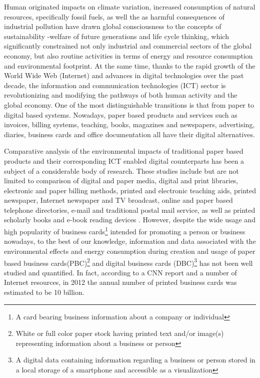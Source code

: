 \documentclass[conference]{IEEEtran}
\begin{document}
Human originated impacts on climate variation, increased consumption of natural resources, specifically fossil fuels, as well the as harmful consequences of industrial pollution have drawn global consciousness to the concepts of sustainability -welfare of future generations and life cycle thinking, which significantly constrained not only industrial and commercial sectors of the global economy, but also routine activities in terms of energy and resource consumption and environmental footprint. At the same time, thanks to the rapid growth of the World Wide Web (Internet) and advances in digital technologies over the past decade, the information and communication technologies (ICT) sector is revolutionizing and modifying the pathways of both human activity and the global economy. One of the most distinguishable transitions is that from paper to digital based systems. Nowadays, paper based products and services such as invoices, billing systems, teaching, books, magazines and newspapers, advertising, diaries, business cards and office documentation all have their digital alternatives.

Comparative analysis of the environmental impacts of traditional paper based products and their corresponding ICT enabled digital counterparts has been a subject of a  considerable body of research. These studies include but are not limited to comparison of digital and paper media, digital and print libraries, electronic and paper billing methods, printed and electronic teaching aids, printed newspaper, Internet newspaper and TV broadcast, online and paper based telephone directories, e-mail and traditional postal mail service, as well as printed scholarly books and e-book reading devices \cite{Bull201410, 6360455, enroth2009, zurkirch2000, kozak2003,hischier2003multifunctional }. However, despite the wide usage and high popularity of business cards\footnote{A card bearing business information about a company or individual} intended for promoting a person or business nowadays, to the best of our knowledge, information and data associated with the environmental effects and energy consumption during creation and usage of paper based business cards(PBC)\footnote{White or full color paper stock having printed text and/or image(s) representing information about a business or person} and digital business cards (DBC)\footnote{A digital data containing information regarding a business or person stored in a local storage of a smartphone and accessible as a visualization} has not been well studied and quantified. In fact, according to a CNN report and a number of Internet resources, in 2012 the annual number of printed business cards was estimated to be 10 billion.
\end{document}
